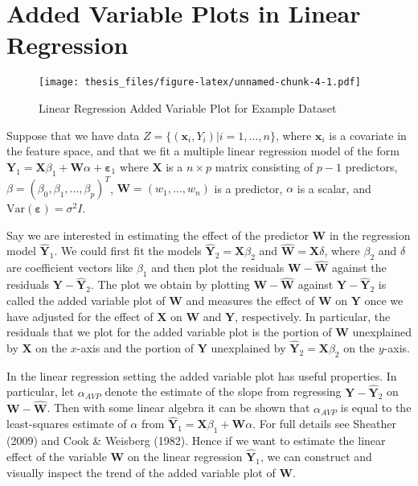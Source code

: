 \documentclass[12pt,twoside]{reedthesis}
\theoremstyle{definition}
\theoremstyle{definition}
\theoremstyle{definition}
\theoremstyle{remark}
\begin{document}
\section{Added Variable Plots in Linear
Regression}\label{added-variable-plots-in-linear-regression}
\begin{figure}
\centering
\texttt{[image: thesis\_files/figure-latex/unnamed-chunk-4-1.pdf]}
\caption{\label{fig:unnamed-chunk-4}\label{AVPlinex}Linear Regression Added
Variable Plot for Example Dataset}
\end{figure}
Suppose that we have data \(Z=\{(\mathbf{x}_i,Y_i)|i=1,\ldots,n\}\),
where \(\mathbf{x}_i\) is a covariate in the feature space, and that we
fit a multiple linear regression model of the form
\(\mathbf{Y}_1=\mathbf{X}\beta_1+\mathbf{W}\alpha+\mathbf{\varepsilon}_1\)
where \(\mathbf{X}\) is a \(n\times p\) matrix consisting of \(p-1\)
predictors, \(\beta=(\beta_0,\beta_1,\ldots,\beta_p)^T\),
\(\mathbf{W}=(w_1,\ldots,w_n)\) is a predictor, \(\alpha\) is a scalar,
and \(\text{Var}(\mathbf{\varepsilon})=\sigma^2 I\). \par

Say we are interested in estimating the effect of the predictor
\(\mathbf{W}\) in the regression model \(\hat{\mathbf{Y}}_1\). We could
first fit the models \(\hat{\mathbf{Y}}_2=\mathbf{X}\beta_2\) and
\(\hat{\mathbf{W}}=\mathbf{X}\delta\), where \(\beta_2\) and \(\delta\)
are coefficient vectors like \(\beta_1\) and then plot the residuals
\(\mathbf{W}-\hat{\mathbf{W}}\) against the residuals
\(\mathbf{Y}-\hat{\mathbf{Y}}_2\). The plot we obtain by plotting
\(\mathbf{W}-\hat{\mathbf{W}}\) against
\(\mathbf{Y}-\hat{\mathbf{Y}}_2\) is called the added variable plot of
\(\mathbf{W}\) and measures the effect of \(\mathbf{W}\) on
\(\mathbf{Y}\) once we have adjusted for the effect of \(\mathbf{X}\) on
\(\mathbf{W}\) and \(\mathbf{Y}\), respectively. In particular, the
residuals that we plot for the added variable plot is the portion of
\(\mathbf{W}\) unexplained by \(\mathbf{X}\) on the \(x\)-axis and the
portion of \(\mathbf{Y}\) unexplained by
\(\hat{\mathbf{Y}}_2=\mathbf{X}\beta_2\) on the \(y\)-axis. \par

In the linear regression setting the added variable plot has useful
properties. In particular, let \(\alpha_{AVP}\) denote the estimate of
the slope from regressing \(\mathbf{Y}-\hat{\mathbf{Y}}_2\) on
\(\mathbf{W}-\hat{\mathbf{W}}\). Then with some linear algebra it can be
shown that \(\alpha_{AVP}\) is equal to the least-squares estimate of
\(\alpha\) from
\(\hat{\mathbf{Y}}_1=\mathbf{X}\beta_1+\mathbf{W}\alpha\). For full
details see Sheather (2009) and Cook \& Weisberg (1982). Hence if we
want to estimate the linear effect of the variable \(\mathbf{W}\) on the
linear regression \(\hat{\mathbf{Y}}_1\), we can construct and visually
inspect the trend of the added variable plot of \(\mathbf{W}\). \par
\end{document}
